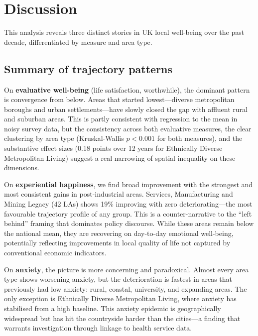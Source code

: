 \documentclass[12pt,a4paper]{article}
\begin{document}
\section{Discussion}

This analysis reveals three distinct stories in UK local well-being over the past decade, differentiated by measure and area type.

\subsection{Summary of trajectory patterns}

On \textbf{evaluative well-being} (life satisfaction, worthwhile), the dominant pattern is convergence from below. Areas that started lowest---diverse metropolitan boroughs and urban settlements---have slowly closed the gap with affluent rural and suburban areas. This is partly consistent with regression to the mean in noisy survey data, but the consistency across both evaluative measures, the clear clustering by area type (Kruskal-Wallis $p < 0.001$ for both measures), and the substantive effect sizes (0.18 points over 12 years for Ethnically Diverse Metropolitan Living) suggest a real narrowing of spatial inequality on these dimensions.

On \textbf{experiential happiness}, we find broad improvement with the strongest and most consistent gains in post-industrial areas. Services, Manufacturing and Mining Legacy (42 LAs) shows 19\% improving with zero deteriorating---the most favourable trajectory profile of any group. This is a counter-narrative to the ``left behind'' framing that dominates policy discourse. While these areas remain below the national mean, they are recovering on day-to-day emotional well-being, potentially reflecting improvements in local quality of life not captured by conventional economic indicators.

On \textbf{anxiety}, the picture is more concerning and paradoxical. Almost every area type shows worsening anxiety, but the deterioration is fastest in areas that previously had low anxiety: rural, coastal, university, and expanding areas. The only exception is Ethnically Diverse Metropolitan Living, where anxiety has stabilised from a high baseline. This anxiety epidemic is geographically widespread but has hit the countryside harder than the cities---a finding that warrants investigation through linkage to health service data.
\end{document}
